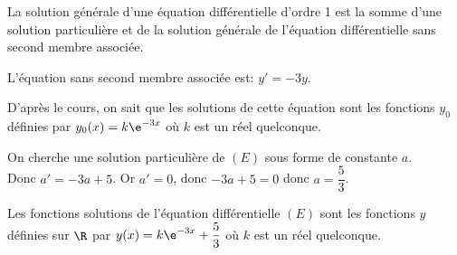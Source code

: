 \medskip

La solution générale d'une équation différentielle d'ordre 1 est la somme d'une solution particulière et de la solution générale de l'équation différentielle sans second membre associée.

\begin{list}{\textbullet}{}
\item L'équation sans second membre associée est: $y'=-3y$.

D'après le cours, on sait que les solutions de cette équation sont les fonctions $y_0$ définies par $y_0(x)= k\e^{-3x}$ où $k$ est un réel quelconque.

\item On cherche une solution particulière de $(E)$ sous forme de constante $a$. \\
Donc $a'=-3a+5$. Or $a'=0$, donc $-3a+5=0$ donc $a=\dfrac{5}{3}$.
\end{list}

Les fonctions solutions de l'équation différentielle $(E)$ sont les fonctions $y$ définies sur $\R$ par $y(x)= k \e^{-3x} +\dfrac{5}{3}$ où $k$ est un réel quelconque.

\bigskip
